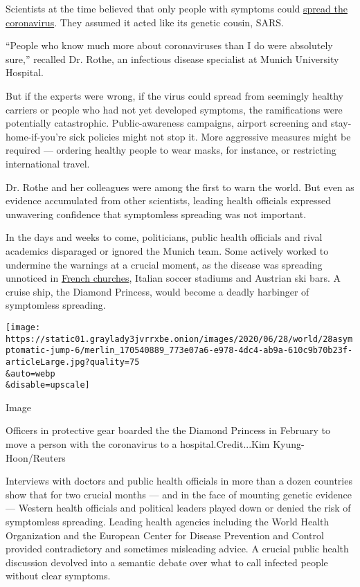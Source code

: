 Scientists at the time believed that only people with symptoms could
\href{https://www.nytimes3xbfgragh.onion/2020/07/21/health/coronavirus-infections-us.html}{spread
the coronavirus}. They assumed it acted like its genetic cousin, SARS.

``People who know much more about coronaviruses than I do were
absolutely sure,'' recalled Dr. Rothe, an infectious disease specialist
at Munich University Hospital.

But if the experts were wrong, if the virus could spread from seemingly
healthy carriers or people who had not yet developed symptoms, the
ramifications were potentially catastrophic. Public-awareness campaigns,
airport screening and stay-home-if-you're sick policies might not stop
it. More aggressive measures might be required --- ordering healthy
people to wear masks, for instance, or restricting international travel.

Dr. Rothe and her colleagues were among the first to warn the world. But
even as evidence accumulated from other scientists, leading health
officials expressed unwavering confidence that symptomless spreading was
not important.

In the days and weeks to come, politicians, public health officials and
rival academics disparaged or ignored the Munich team. Some actively
worked to undermine the warnings at a crucial moment, as the disease was
spreading unnoticed in
\href{https://www.reuters.com/article/us-health-coronavirus-france-church-spec/special-report-five-days-of-worship-that-set-a-virus-time-bomb-in-france-idUSKBN21H0Q2}{French
churches}, Italian soccer stadiums and Austrian ski bars. A cruise ship,
the Diamond Princess, would become a deadly harbinger of symptomless
spreading.

\texttt{[image: https://static01.graylady3jvrrxbe.onion/images/2020/06/28/world/28asymptomatic-jump-6/merlin\_170540889\_773e07a6-e978-4dc4-ab9a-610c9b70b23f-articleLarge.jpg?quality=75\\\&auto=webp\\\&disable=upscale]}

Image

Officers in protective gear boarded the the Diamond Princess in February
to move a person with the coronavirus to a hospital.Credit...Kim
Kyung-Hoon/Reuters

Interviews with doctors and public health officials in more than a dozen
countries show that for two crucial months --- and in the face of
mounting genetic evidence --- Western health officials and political
leaders played down or denied the risk of symptomless spreading. Leading
health agencies including the World Health Organization and the European
Center for Disease Prevention and Control provided contradictory and
sometimes misleading advice. A crucial public health discussion devolved
into a semantic debate over what to call infected people without clear
symptoms.

